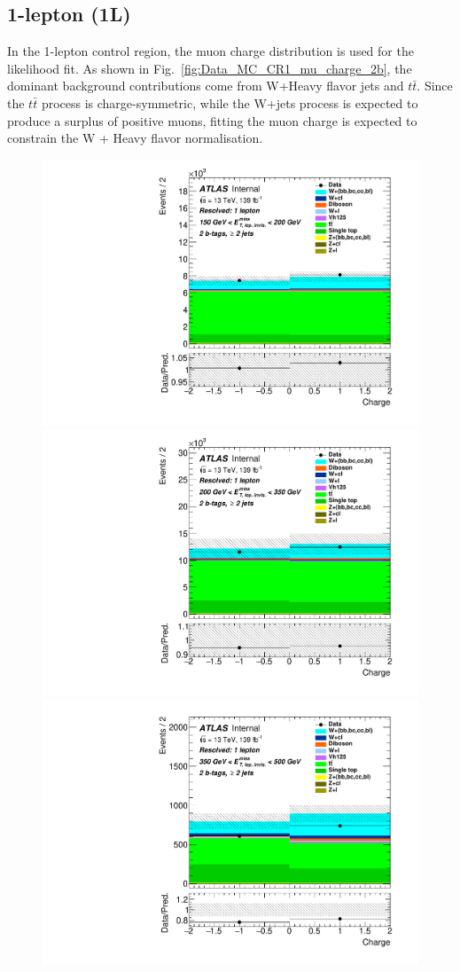 \subsection{1-lepton (1L)}

\par In the 1-lepton control region, the muon charge distribution is used for the likelihood fit. As shown in Fig.~\ref{fig:Data_MC_CR1_mu_charge_2b}, the
dominant background contributions come from W+Heavy flavor jets and $t\bar{t}$. 
Since the $t\bar{t}$ process is charge-symmetric, while the W+jets process is expected to produce a surplus of positive muons, 
fitting the muon charge is expected to constrain the W + Heavy flavor normalisation.

\begin{figure}[!htb]
  \includegraphics[width=0.46\linewidth]{chapters/c9/figures/Region_distCharge_J2_L1_T2_DCR1_Y2015_incJet1_Fat0_incFat1_BMin150_BMax200_Prefit.pdf}
  \includegraphics[width=0.46\linewidth]{chapters/c9/figures/Region_distCharge_J2_L1_T2_DCR1_Y2015_incJet1_Fat0_incFat1_BMin200_BMax350_Prefit.pdf}\\
  \includegraphics[width=0.46\linewidth]{chapters/c9/figures/Region_distCharge_J2_L1_T2_DCR1_Y2015_incJet1_Fat0_incFat1_BMin350_BMax500_Prefit.pdf}

\end{figure}
